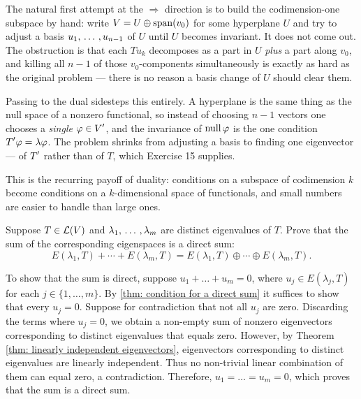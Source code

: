 \begin{ainote}
  The natural first attempt at the $\Rightarrow$ direction is to build the codimension-one subspace by hand: write $V = U \oplus \operatorname{span} (v_0)$ for some hyperplane $U$ and try to adjust a basis $u_1, {\, \ldots \,\,}, u_{n-1}$ of $U$ until $U$ becomes invariant. It does not come out. The obstruction is that each $T u_k$ decomposes as a part in $U$ \emph{plus} a part along $v_0$, and killing all $n-1$ of those $v_0$-components simultaneously is exactly as hard as the original problem --- there is no reason a basis change of $U$ should clear them.

  Passing to the dual sidesteps this entirely. A hyperplane is the same thing as the null space of a nonzero functional, so instead of choosing $n-1$ vectors one chooses a \emph{single} $\varphi \in \displaystyle V'$, and the invariance of $\operatorname{null} \varphi$ is the one condition $\displaystyle T' \varphi = \lambda \varphi$. The problem shrinks from adjusting a basis to finding one eigenvector --- of $\displaystyle T'$ rather than of $T$, which Exercise 15 supplies.

  This is the recurring payoff of duality: conditions on a subspace of codimension $k$ become conditions on a $k$-dimensional space of functionals, and small numbers are easier to handle than large ones.
\end{ainote}

\begin{xrcs}
  Suppose $T \in \mathcal{L}(V)$ and $\lambda_1, {\, \ldots \,\,}, \lambda_m$ are distinct eigenvalues of $T$. Prove that the sum of the corresponding eigenspaces is a direct sum:
  \begin{equation}
    E(\lambda_1, T) + \cdots + E(\lambda_m, T) = E(\lambda_1, T) \oplus \cdots \oplus E(\lambda_m, T).
  \end{equation}
  \begin{xprf}
    To show that the sum is direct, suppose $u_1 + \dots + u_m = 0$, where $u_j \in E(\lambda_j, T)$ for each $j \in \{1, \dots, m\}$.
    By \ref{thm: condition for a direct sum} it suffices to show that every $u_j = 0$.
    Suppose for contradiction that not all $u_j$ are zero.
    Discarding the terms where $u_j = 0$, we obtain a non-empty sum of nonzero eigenvectors corresponding to distinct eigenvalues that equals zero.
    However, by Theorem \ref{thm: linearly independent eigenvectors}, eigenvectors corresponding to distinct eigenvalues are linearly independent.
    Thus no non-trivial linear combination of them can equal zero, a contradiction.
    Therefore, $u_1 = \dots = u_m = 0$, which proves that the sum is a direct sum.
  \end{xprf}
\end{xrcs}


